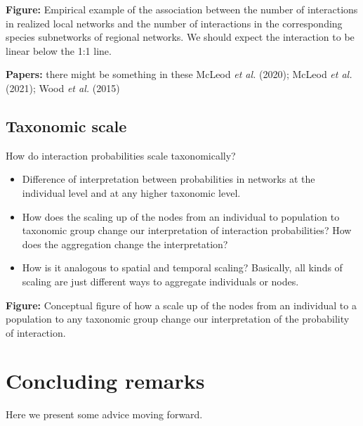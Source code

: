 \documentclass[10pt,oneside]{article}
\begin{document}
\textbf{Figure:} Empirical example of the association between the number
of interactions in realized local networks and the number of
interactions in the corresponding species subnetworks of regional
networks. We should expect the interaction to be linear below the 1:1
line.

\textbf{Papers:} there might be something in these McLeod \emph{et al.}
(2020); McLeod \emph{et al.} (2021); Wood \emph{et al.} (2015)

\hypertarget{taxonomic-scale}{%
\subsection{Taxonomic scale}\label{taxonomic-scale}}

How do interaction probabilities scale taxonomically?

\begin{itemize}
\tightlist
\item
  Difference of interpretation between probabilities in networks at the
  individual level and at any higher taxonomic level.
\item
  How does the scaling up of the nodes from an individual to population
  to taxonomic group change our interpretation of interaction
  probabilities? How does the aggregation change the interpretation?
\item
  How is it analogous to spatial and temporal scaling? Basically, all
  kinds of scaling are just different ways to aggregate individuals or
  nodes.
\end{itemize}

\textbf{Figure:} Conceptual figure of how a scale up of the nodes from
an individual to a population to any taxonomic group change our
interpretation of the probability of interaction.

\hypertarget{concluding-remarks}{%
\section{Concluding remarks}\label{concluding-remarks}}

Here we present some advice moving forward.
\end{document}
